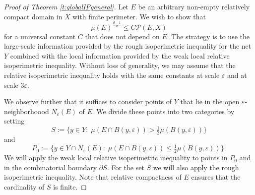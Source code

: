 \documentclass[10pt,letterpaper]{amsart}
\theoremstyle{definition}
\numberwithin{thm}{subsection}
\numberwithin{equation}{section}
\begin{document}
\begin{proof}[Proof of Theorem \ref{t:globalIPgeneral}]
Let $E$ be an arbitrary non-empty relatively compact domain in $X$ with finite perimeter. We wish to show that
\begin{displaymath}
\mu(E)^{\frac{d-1}{d}} \leq C \mathcal{P}(E,X)
\end{displaymath}
for a universal constant $C$ that does not depend on $E$. The strategy is to use the large-scale information provided by the rough isoperimetric inequality for the net $Y$ combined with the local information provided by the weak local relative isoperimetric inequality. Without loss of generality, we may assume that the relative isoperimetric inequality holds with the same constants at scale $\varepsilon$ and at scale $3\varepsilon$.

 We observe further that  it suffices to consider points of $Y$ that lie in the open $\varepsilon$-neighborhoood $N_{\varepsilon}(E)$ of $E$. We divide these points into two categories by setting
$$
S := \{y\in Y:\; \mu(E\cap B(y,\varepsilon))>\tfrac{1}{2} \mu(B(y,\varepsilon))\}
$$
and
$$
P_0 := \{y\in Y\cap N_{\varepsilon}(E):\; \mu(E\cap B(y,\varepsilon))\leq \tfrac{1}{2} \mu(B(y,\varepsilon))\}.
$$
We will apply the weak local relative isoperimetric inequality to points in $P_0$ and in the combinatorial boundary $\partial S$. For the set $S$ we will also apply
the rough isoperimetric inequality. Note that relative compactness of $E$ ensures that the cardinality of $S$ is finite.


\end{proof}
\end{document}
